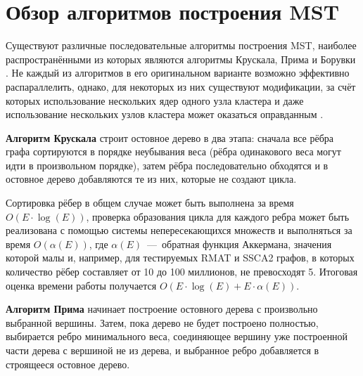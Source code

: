 \documentclass[a4paper,10pt]{extarticle}
\begin{document}

\section{Обзор алгоритмов построения MST}
Существуют различные последовательные алгоритмы построения MST, наиболее распространёнными из которых являются алгоритмы Крускала, Прима и Борувки \cite{cormen}.
Не каждый из алгоритмов в его оригинальном варианте возможно эффективно распараллелить, однако, для некоторых из них существуют модификации, за счёт которых использование нескольких ядер одного узла кластера и даже использование нескольких узлов кластера может оказаться оправданным \cite{boruvka-prima,kruskal-parallel}.


\textbf{Алгоритм Крускала} строит остовное дерево в два этапа: сначала все рёбра графа сортируются в порядке неубывания веса (рёбра одинакового веса могут идти в произвольном порядке), затем рёбра последовательно обходятся и в остовное дерево добавляются те из них, которые не создают цикла.

Сортировка рёбер в общем случае может быть выполнена за время $O(E \cdot \log(E))$, проверка образования цикла для каждого ребра может быть реализована с помощью системы непересекающихся множеств и выполняться за время $O(\alpha(E))$, где $\alpha(E)$~---~обратная функция Аккермана, значения которой малы и, например, для тестируемых RMAT и SSCA2 графов, в которых количество рёбер составляет от 10 до 100 миллионов, не превосходят 5. Итоговая оценка времени работы получается $O(E \cdot \log(E) + E \cdot \alpha(E))$.


\textbf{Алгоритм Прима} начинает построение остовного дерева с произвольно выбранной вершины. Затем, пока дерево не будет построено полностью, выбирается ребро минимального веса, соединяющее вершину уже построенной части дерева с вершиной не из дерева, и выбранное ребро добавляется в строящееся остовное дерево.
\end{document}

